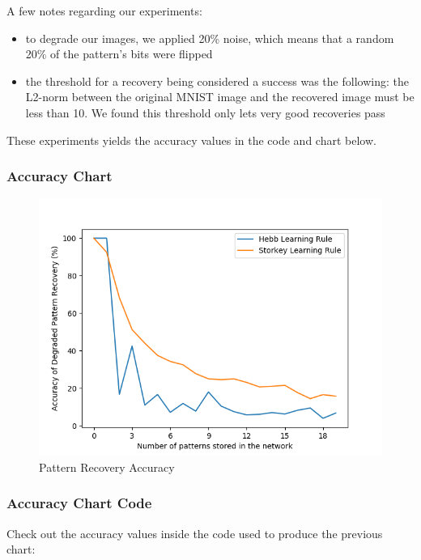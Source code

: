 \documentclass[11pt]{article}
\begin{document}
\pagebreak

A few notes regarding our experiments:

\begin{itemize}
\item
  to degrade our images, we applied 20\% noise, which means that a random 20\%
  of the pattern's bits were flipped
\item
  the threshold for a recovery being considered a success was the
  following: the L2-norm between the original MNIST image and the recovered
  image must be less than 10. We found this threshold only lets very
  good recoveries pass
\end{itemize}

These experiments yields the accuracy values in the code and chart
below.

\subsubsection{Accuracy Chart}\label{accuracy-chart}

\begin{figure}[htbp]
	\centering
	\includegraphics[scale=1.15]{../figures/q1/accuracy.png}
	\caption{Pattern Recovery Accuracy}
\end{figure}

\pagebreak

\subsubsection{Accuracy Chart Code}

Check out the accuracy values inside the code used to produce the previous chart:
\end{document}
